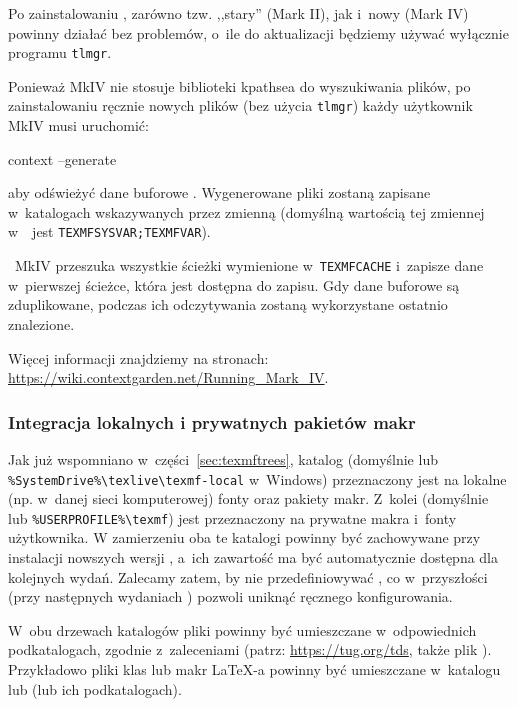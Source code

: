 \documentclass{article}
\begin{document}
Po zainstalowaniu \TL, zarówno tzw. ,,stary'' \ConTeXt{} (Mark II), jak i~nowy
\ConTeXt{} (Mark IV) powinny działać  bez problemów, o~ile do aktualizacji będziemy
używać wyłącznie programu \verb+tlmgr+.

Ponieważ \ConTeXt{} MkIV nie stosuje biblioteki kpathsea do
wyszukiwania plików, po zainstalowaniu ręcznie nowych plików (bez użycia
\verb+tlmgr+) każdy użytkownik MkIV  musi uruchomić:
\begin{sverbatim}
context --generate
\end{sverbatim}
aby odświeżyć dane buforowe \ConTeXt.
Wygenerowane pliki zostaną zapisane w~katalogach wskazywanych przez
zmienną  (domyślną wartością tej zmiennej w~\TL\ jest
\verb+TEXMFSYSVAR;TEXMFVAR+).

\ConTeXt\ MkIV przeszuka wszystkie ścieżki wymienione w~\verb+TEXMFCACHE+
i~zapisze dane w~pierwszej ścieżce, która jest dostępna
do zapisu. Gdy dane buforowe są zduplikowane, podczas ich odczytywania
zostaną wykorzystane ostatnio znalezione.

Więcej informacji znajdziemy na stronach:
\url{https://wiki.contextgarden.net/Running_Mark_IV}.

\subsubsection{Integracja lokalnych i prywatnych pakietów makr}
\label{sec:local-personal-macros}

Jak już wspomniano w~części~\ref{sec:texmftrees}, katalog 
(domyślnie  lub
\verb|%SystemDrive%\texlive\texmf-local| w~Windows) przeznaczony jest na lokalne
(np. w~danej sieci komputerowej) fonty oraz pakiety makr. Z~kolei
 (domyślnie  lub
\verb|%USERPROFILE%\texmf|) jest przeznaczony na prywatne makra i~fonty
użytkownika. W zamierzeniu oba te katalogi powinny być zachowywane przy
instalacji nowszych wersji \TL{}, a~ich zawartość ma być automatycznie
dostępna dla kolejnych wydań. Zalecamy zatem, by nie
przedefiniowywać , co w~przyszłości (przy następnych wydaniach \TL) pozwoli uniknąć ręcznego konfigurowania.

W~obu drzewach katalogów pliki powinny być umieszczane w~odpowiednich
podkatalogach, zgodnie z~zaleceniami \TDS{} (patrz: \url{https://tug.org/tds},
także  plik ). Przykładowo pliki klas lub
makr \LaTeX-a powinny być umieszczane w~katalogu
 lub 
(lub ich podkatalogach).
\end{document}
